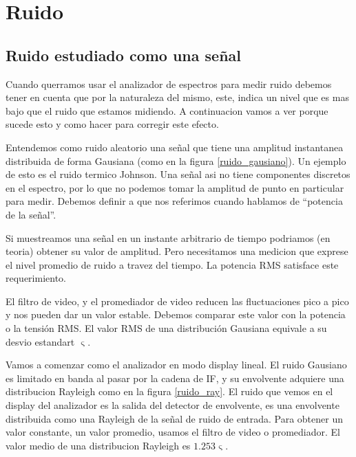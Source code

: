 \documentclass[a4paper,12pt,twoside]{article}
\newcommand{\quotes}[1]{``#1''}
\begin{document}


\newpage

\section{Ruido}
\subsection{Ruido estudiado como una señal}

Cuando querramos usar el analizador de espectros para medir ruido debemos tener en cuenta que por la naturaleza del mismo, este, indica un nivel que es mas bajo que el ruido que estamos midiendo. A continuacion vamos a ver porque sucede esto y como hacer para corregir este efecto.

Entendemos como ruido aleatorio una señal que tiene una amplitud instantanea distribuida de forma Gausiana (como en la figura \ref{ruido_gausiano}). Un ejemplo de esto es el ruido termico Johnson. Una señal asi no tiene componentes discretos en el espectro, por lo que no podemos tomar la amplitud de punto en particular para medir.
Debemos definir a que nos referimos cuando hablamos de \quotes{potencia de la señal}.

Si muestreamos una señal en un instante arbitrario de tiempo podriamos (en teoria) obtener su valor de amplitud. Pero necesitamos una medicion que exprese el nivel promedio de ruido a travez del tiempo. La potencia RMS satisface este requerimiento.

El filtro de video, y el promediador de video reducen las fluctuaciones pico a pico y nos pueden dar un valor estable. Debemos comparar este valor con la potencia o la tensión RMS. El valor RMS de una distribución Gausiana equivale a su desvio estandart $\upvarsigma$.

Vamos a comenzar como el analizador en modo display lineal. El ruido Gausiano es limitado en banda al pasar por la cadena de IF, y su envolvente adquiere una distribucion Rayleigh como en la figura \ref{ruido_ray}. El ruido que vemos en el display del analizador es la salida del detector de envolvente, es una envolvente distribuida como una Rayleigh de la señal de ruido de entrada. Para obtener un valor constante, un valor promedio, usamos el filtro de video o promediador. El valor medio de una distribucion Rayleigh es $1.253 \upvarsigma$. 
\end{document}
